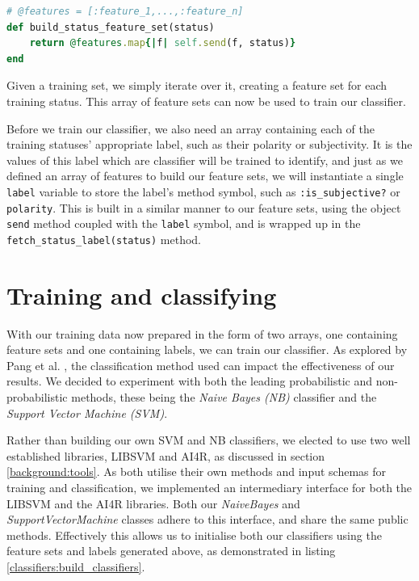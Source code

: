 \begin{lstlisting}[language=Ruby, caption={Method for building a status' feature set}, label=classifiers:status_feature_set]
# @features = [:feature_1,...,:feature_n]
def build_status_feature_set(status)
	return @features.map{|f| self.send(f, status)}
end
\end{lstlisting}

Given a training set, we simply iterate over it, creating a feature set for each training status. This array of feature sets can now be used to train our classifier.

Before we train our classifier, we also need an array containing each of the training statuses' appropriate label, such as their polarity or subjectivity. It is the values of this label which are classifier will be trained to identify, and just as we defined an array of features to build our feature sets, we will instantiate a single \texttt{label} variable to store the label's method symbol, such as \texttt{:is\_subjective?} or \texttt{polarity}. This is built in a similar manner to our feature sets, using the object \texttt{send} method coupled with the \texttt{label} symbol, and is wrapped up in the \texttt{fetch\-\_status\-\_label\-(status)} method.

\section{Training and classifying}

With our training data now prepared in the form of two arrays, one containing feature sets and one containing labels, we can train our classifier. As explored by Pang et al. \cite{Pang:2008wj}, the classification method used can impact the effectiveness of our results. We decided to experiment with both the leading probabilistic and non-probabilistic methods, these being the \emph{Naive Bayes (NB)} classifier and the \emph{Support Vector Machine (SVM)}. 

Rather than building our own SVM and NB classifiers, we elected to use two well established libraries, LIBSVM and AI4R, as discussed in section \ref{background:tools}. As both utilise their own methods and input schemas for training and classification, we implemented an intermediary interface for both the LIBSVM and the AI4R libraries. Both our \emph{NaiveBayes} and \emph{SupportVectorMachine} classes adhere to this interface, and share the same public methods. Effectively this allows us to initialise both our classifiers using the feature sets and labels generated above, as demonstrated in listing \ref{classifiers:build_classifiers}. 

